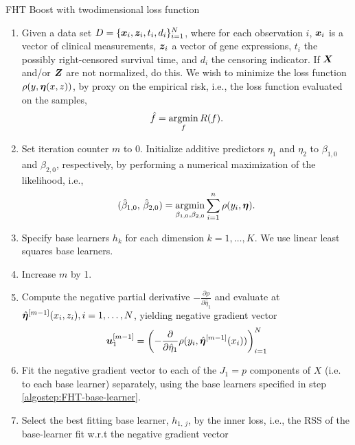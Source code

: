 \begin{algorithm}
\caption{FHT Boost with twodimensional loss function}
\label{algo:fhtboost-with-intercept}
\begin{enumerate}
    \item
        Given a data set $D=\{\bm{x}_i, \bm{z}_i, t_i,d_i\}_{i=1}^N$, where for each observation $i$, $\bm{x}_i$ is a vector of clinical measurements,
        $\bm{z}_i$ a vector of gene expressions, $t_i$ the possibly right-censored survival time, and $d_i$ the censoring indicator. 
        If $\bm{X}$ and/or $\bm{Z}$ are not normalized, do this.
        We wish to minimize the loss function $\rho(y,\boldsymbol{\eta}(x,z))$, by proxy on the empirical risk, i.e., the loss function evaluated on the samples,
        \begin{equation}
            \hat{f}=\operatorname*{argmin}_{f}R(f).
        \end{equation}
    \item
        Set iteration counter $m$ to $0$.
        Initialize additive predictors $\eta_1$ and $\eta_2$ to $\beta_{1,0}$ and $\beta_{2,0}$, respectively, by performing a numerical maximization of the likelihood, i.e.,
        \begin{equation}
            (\hat{\beta}_{1,0},\,\hat{\beta}_{2,0})=\operatorname*{argmin}_{\beta_{1,0},\beta_{2,0}}\sum_{i=1}^n\rho(y_i,\boldsymbol{\eta}).
        \end{equation}
    \item\label{algostep:FHT-base-learner}
        Specify base learners $h_k$ for each dimension $k=1,\ldots,K$.
        We use linear least squares base learners.
    \item\label{algostep:FHT-init}
        Increase $m$ by 1.
    \item
        Compute the negative partial derivative $-\frac{\partial\rho}{\partial \hat{\eta}_1}$
        and evaluate at $\hat{\boldsymbol{\eta}}^{[m-1]}(x_i,z_i),i=1,\ldots,N$, yielding negative gradient vector
        \begin{equation}
            \bm{u}^{[m-1]}_1=\left(-\frac{\partial}{\partial \hat{\eta}_1}\rho(y_i, \hat{\boldsymbol{\eta}}^{[m-1]}(x_i))\right)_{i=1}^N
        \end{equation}
    \item
        Fit the negative gradient vector to each of the $J_1=p$ components of $X$ (i.e. to each base learner) separately, using the base learners specified in step \ref{algostep:FHT-base-learner}.
    \item
        Select the best fitting base learner, $h_{1,\,j}$, by the inner loss,
        i.e., the RSS of the base-learner fit w.r.t the negative gradient vector

\end{enumerate}
\end{algorithm}
